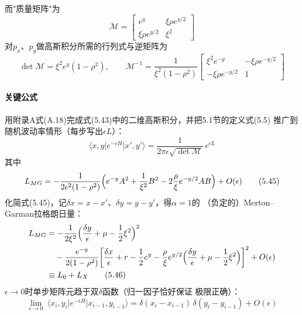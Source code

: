 而"质量矩阵"为
\begin{equation*}
\mathcal{M}=\begin{bmatrix}
e^{y} & \xi\rho e^{y/2}\\
\xi\rho e^{y/2} & \xi^{2}
\end{bmatrix}
\end{equation*}
对$p_{x}$、$p_{y}$做高斯积分所需的行列式与逆矩阵为
\begin{equation*}
\det\mathcal{M}=\xi^{2}e^{y}(1-\rho^{2}),\qquad
\mathcal{M}^{-1}=\frac{1}{\xi^{2}(1-\rho^{2})}
\begin{bmatrix}
\xi^{2}e^{-y} & -\xi\rho e^{-y/2}\\
-\xi\rho e^{-y/2} & 1
\end{bmatrix}
\end{equation*}

\paragraph{关键公式}
用附录A式(A.18)完成式(5.43)中的二维高斯积分，并把5.1节的定义式(5.5)
推广到随机波动率情形（每步写出$\epsilon L$）：
\begin{equation*}
\langle x,y\vert e^{-\epsilon H}\vert x',y'\rangle
=\frac{1}{2\pi\epsilon\sqrt{\det\mathcal{M}}}\,e^{\epsilon L}
\tag{5.44}
\end{equation*}
其中
\begin{equation*}
L_{MG}=-\frac{1}{2\epsilon^{2}(1-\rho^{2})}
\Bigl(e^{-y}A^{2}+\frac{1}{\xi^{2}}B^{2}
-2\frac{\rho}{\xi}e^{-y/2}AB\Bigr)+O(\epsilon)
\tag{5.45}
\end{equation*}
化简式(5.45)，记$\delta x=x-x'$、$\delta y=y-y'$，得$\alpha=1$的
（负定的）Merton--Garman拉格朗日量：
\begin{align*}
L_{MG}&=-\frac{1}{2\xi^{2}}\Bigl(\frac{\delta y}{\epsilon}
+\mu-\frac{1}{2}\xi^{2}\Bigr)^{2}\\
&\quad-\frac{e^{-y}}{2(1-\rho^{2})}
\biggl[\frac{\delta x}{\epsilon}+r-\frac{1}{2}e^{y}
-\frac{\rho}{\xi}e^{y/2}\Bigl(\frac{\delta y}{\epsilon}
+\mu-\frac{1}{2}\xi^{2}\Bigr)\biggr]^{2}+O(\epsilon)\\
&\equiv L_{0}+L_{X}
\tag{5.46}
\end{align*}
$\epsilon\to0$时单步矩阵元趋于双$\delta$函数（归一因子恰好保证
极限正确）：
\begin{equation*}
\lim_{\epsilon\to0}\ \langle x_{i},y_{i}\vert e^{-\epsilon H}\vert
x_{i-1},y_{i-1}\rangle
=\delta(x_{i}-x_{i-1})\,\delta(y_{i}-y_{i-1})+O(\epsilon)
\tag{5.47}
\end{equation*}
